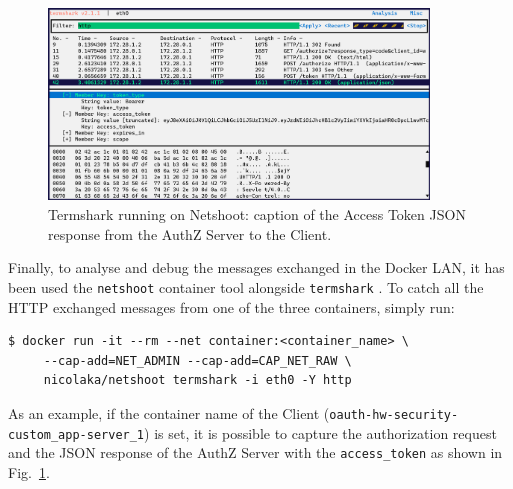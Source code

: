 \documentclass[a4paper,12pt]{article}
\def\myfig#1{Fig.~#1\xspace}
\begin{document}
\begin{figure}[ht]
    \centering
    \includegraphics[width=0.9\textwidth]{figures/netshoot.png}
    \caption{Termshark running on Netshoot: caption of the Access Token JSON response from the AuthZ Server to the Client.}
    \label{fig:netshoot}
\end{figure}

Finally, to analyse and debug the messages exchanged in the Docker LAN, it has been used the \texttt{netshoot} \cite{netsh} container tool alongside \texttt{termshark} \cite{terms}. To catch all the HTTP exchanged messages from one of the three containers, simply run:

\begin{lstlisting}[basicstyle=\ttfamily]
  $ docker run -it --rm --net container:<container_name> \
     --cap-add=NET_ADMIN --cap-add=CAP_NET_RAW \
     nicolaka/netshoot termshark -i eth0 -Y http
\end{lstlisting}

As an example, if the container name of the Client (\texttt{oauth-hw-security-custom\_app-server\_1}) is set, it is possible to capture the authorization request and the JSON response of the AuthZ Server with the \texttt{access\_token} as shown in \myfig{\ref{fig:netshoot}}.
\end{document}
